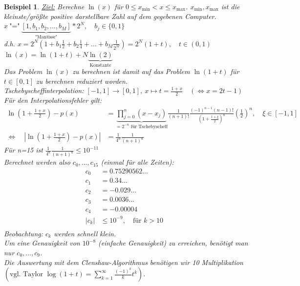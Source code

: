 \documentclass[12pt]{article}
\theoremstyle{break}
\newtheorem{example}[theorem]{Beispiel}
\begin{document}
\begin{example}
\underline{Ziel:} Berechne $\ln(x)$ für $0 \leq x_{\min} < x \leq x_{\max}$. $x_{\min}, x_{\max}$ ist die kleinste/größte positive darstellbare Zahl auf dem gegebenen Computer. \\
$x \medspace \text{"="} \medspace \underbrace{\left[ 1, b_1, b_2, ..., b_M \right]}_{\text{"Mantisse"}} * 2^N, \quad b_j \in \{0,1\}$\\
d.h. $ x = 2^N (1+ b_1 \frac{1}{2} + b_2 \frac{1}{4} + ... + b_M \frac{1}{2^M}) = 2^N (1+t), \quad t \in (0,1)$ \\
$\ln(x) = \ln(1+t) + N \underbrace{\ln(2)}_{\text{Konstante}}$ \\
Das Problem $\ln(x)$ zu berechnen ist damit auf das Problem $\ln(1+t)$ für $t \in [0,1]$ zu berechnen reduziert worden. \\
Tschebyscheffinterpolation: $[-1, 1] \rightarrow [0,1], \medspace x \mapsto t = \frac{1+x}{2} \quad (\Leftrightarrow x=2t-1)$ \\
Für den Interpolationsfehler gilt:
\begin{align*}
\ln\left(1+ \frac{1+x}{2}\right) -p(x) &= \underbrace{\prod_{j=0}^n (x-x_j)}_{=2^{-n} \text{ für Tschebyscheff}} \frac{1}{(n+1)!} \frac{(-1)^{n-1} (n-1)!}{\left(1+\frac{1+\xi}{2}\right)^n} \left(\frac{1}{2}\right)^n, \quad \xi \in [-1, 1] &\\
\Leftrightarrow \quad \left\vert \ln\left(1+ \frac{1+x}{2}\right) -p(x) \right\vert &= \frac{1}{4^n} \frac{1}{(n+1)^n}
\end{align*}
Für n=15 ist $\frac{1}{4^n} \frac{1}{(n+1)^n} \leq 10^{-11}$ \\
Berechnet werden also $c_0,..., c_{15}$ (einmal für alle Zeiten):
\begin{align*}
c_0 &= 0.75290562... &\\
c_1 &= 0.34... &\\
c_2 &= -0.029... &\\
c_3 &= 0.0036... &\\
c_4 &= -0.00004 &\\
\vert c_k \vert &\leq 10^{-9}, \quad \text{für }k >10 &\\
\end{align*}
Beobachtung: $c_k$ werden schnell klein.\\
Um eine Genauigkeit von $10^{-8}$ (einfache Genauigkeit) zu erreichen, benötigt man nur $c_0,..., c_9$.\\
Die Auswertung mit dem Clenshaw-Algorithmus benötigen wir 10 Multiplikation $\left(\text{vgl. Taylor }\log(1+t) = \sum_{k=1}^{\infty} \frac{(-1)^k}{k}t^k\right)$.
\end{example}
\end{document}
